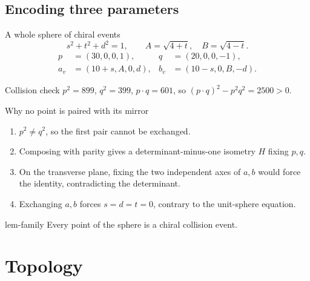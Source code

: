 \documentclass{beamer}
\begin{document}
\subsection{Encoding three parameters}
\begin{frame}{A whole sphere of chiral events}
  \[
  s^2+t^2+d^2=1,\qquad
  A=\sqrt{4+t},\quad B=\sqrt{4-t}.
  \]
  \[
  \begin{aligned}
  p&=(30,0,0,1),&q&=(20,0,0,-1),\\
  a_v&=(10+s,A,0,d),&b_v&=(10-s,0,B,-d).
  \end{aligned}
  \]
  \begin{block}{Collision check}
  $p^2=899$, $q^2=399$, $p\cdot q=601$, so
  $(p\cdot q)^2-p^2q^2=2500>0$.
  \end{block}
\end{frame}
\begin{frame}{Why no point is paired with its mirror}
  \begin{enumerate}
    \item $p^2\ne q^2$, so the first pair cannot be exchanged.
    \item Composing with parity gives a determinant-minus-one isometry $H$ fixing $p,q$.
    \item On the transverse plane, fixing the two independent axes of $a,b$ would force the identity, contradicting the determinant.
    \item Exchanging $a,b$ forces $s=d=t=0$, contrary to the unit-sphere equation.
  \end{enumerate}
  \begin{bookresult}{lem-family}
    Every point of the sphere is a chiral collision event.
  \end{bookresult}
\end{frame}
\section{Topology}
\end{document}
